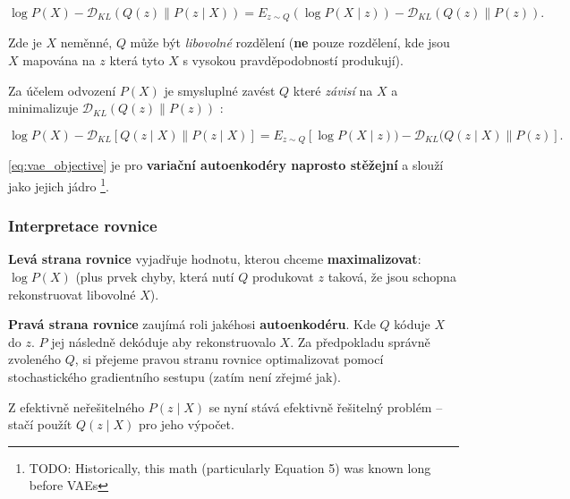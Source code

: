 \begin{equation}
    \log P(X) - \mathcal{D}_{KL}(Q(z)\parallel P(z\mid X)) = E_{z \sim Q}(\log P(X\mid z)) - \mathcal{D}_{KL}(Q(z)\parallel P(z)).
\end{equation}

Zde je $X$ neměnné, $Q$ může být \emph{libovolné} rozdělení (\textbf{ne} pouze rozdělení, kde jsou $X$ mapována na $z$ která tyto $X$ s vysokou pravděpodobností produkují).

Za účelem odvození $P(X)$ je smysluplné zavést $Q$ které \emph{závisí} na $X$ a minimalizuje $\mathcal{D}_{KL}(Q(z)\parallel P(z))$ \cite{Doersch2021}:

\begin{equation} \label{eq:vae_objective}
    \log P(X) - \mathcal{D}_{KL}\left[ Q(z \mid X)\parallel P(z\mid X) \right] = E_{z \sim Q}\left[ \log P(X\mid z)) - \mathcal{D}_{KL}(Q(z\mid X)\parallel P(z) \right]. 
\end{equation}

\autoref{eq:vae_objective} je pro \textbf{variační autoenkodéry naprosto stěžejní} a slouží jako jejich jádro \footnote{TODO: Historically, this math (particularly Equation 5) was known long before VAEs}. \cite{Doersch2021}


\subsubsection{Interpretace rovnice}
\textbf{Levá strana rovnice} vyjadřuje hodnotu, kterou chceme \textbf{maximalizovat}: $\log P(X)$ (plus prvek chyby, která nutí $Q$ produkovat $z$ taková, že jsou schopna rekonstruovat libovolné $X$). \cite{Doersch2021}

\textbf{Pravá strana rovnice} zaujímá roli jakéhosi \textbf{autoenkodéru}. Kde $Q$ kóduje $X$ do $z$. $P$ jej následně dekóduje aby rekonstruovalo $X$.
Za předpokladu správně zvoleného $Q$, si přejeme pravou stranu rovnice optimalizovat pomocí stochastického gradientního sestupu (zatím není zřejmé jak). \cite{Doersch2021}

Z efektivně neřešitelného $P(z\mid X)$ se nyní stává efektivně řešitelný problém – stačí použít $Q(z\mid X)$ pro jeho výpočet. \cite{Doersch2021}